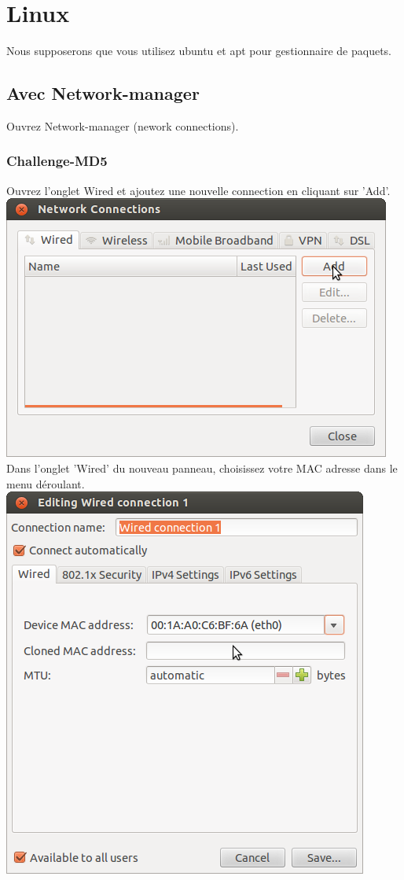 \section{Linux}
Nous supposerons que vous utilisez ubuntu et apt pour gestionnaire de paquets.


\subsection{Avec Network-manager}

Ouvrez Network-manager (nework connections).
\subsubsection{Challenge-MD5}
Ouvrez l'onglet Wired et ajoutez une nouvelle connection en cliquant sur 'Add'.\\
\includegraphics[width=\screenShotSize{}]{imgUser/wiredAdd.png}\\
Dans l'onglet 'Wired' du nouveau panneau, choisissez votre MAC adresse dans le menu déroulant.\\
\includegraphics[width=\screenShotSize{}]{imgUser/setMac.png}\\
